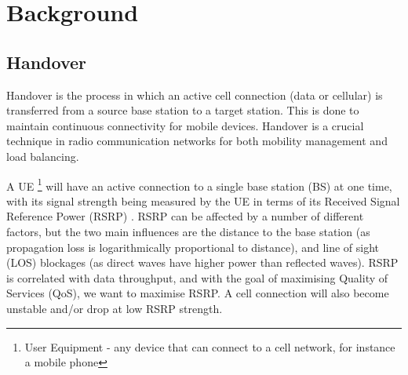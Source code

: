 \chapter{Background}
\section{Handover}
Handover is the process in which an active cell connection (data or cellular) is transferred from a source base station to a target station. This is done to maintain continuous connectivity for mobile devices. Handover is a crucial technique in radio communication networks for both mobility management and load balancing.

A UE \footnote{User Equipment - any device that can connect to a cell network, for instance a mobile phone} will have an active connection to a single base station (BS) at one time, with its signal strength being measured by the UE in terms of its Received Signal Reference Power (RSRP) . RSRP can be affected by a number of different factors, but the two main influences are the distance to the base station (as propagation loss is logarithmically proportional to distance), and line of sight (LOS) blockages (as direct waves have higher power than reflected waves). 
RSRP is correlated with data throughput, and with the goal of maximising Quality of Services (QoS), we want to maximise RSRP. A cell connection will also become unstable and/or drop at low RSRP strength.

